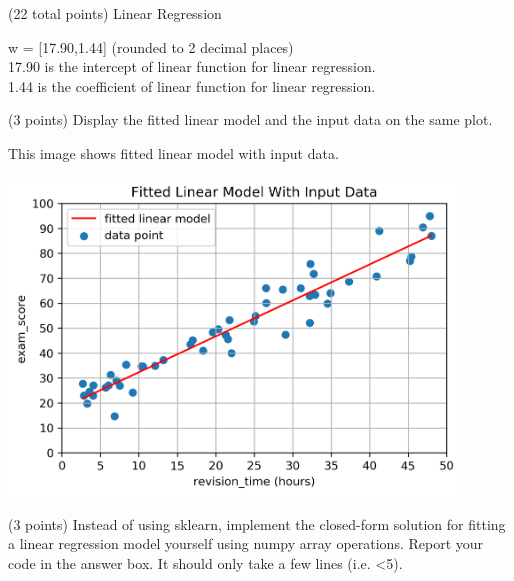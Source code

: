 \documentclass[12pt]{article}
\begin{document}
\begin{question}{(22 total points) Linear Regression}
\begin{subquestion}
\begin{answerbox}{10em}
w = [17.90,1.44] (rounded to 2 decimal places)\\
17.90 is the intercept of linear function for linear regression.\\
1.44 is the coefficient of linear function for linear regression.
\end{answerbox}



\end{subquestion}



%
%
\begin{subquestion}{(3 points) Display the fitted linear model and the input data on the same plot.
}


\begin{answerbox}{35em}
This image shows fitted linear model with input data.
\begin{center}
\includegraphics[width=0.9\textwidth]{linear.png}
\end{center}
\end{answerbox}



\end{subquestion}



%
%
\begin{subquestion}{(3 points) Instead of using sklearn, implement the closed-form solution for fitting a linear regression model yourself using numpy array operations.  
Report your code in the answer box.
It should only take a few lines (i.e. <5).\\ 
}



\end{subquestion}
\end{question}
\end{document}
